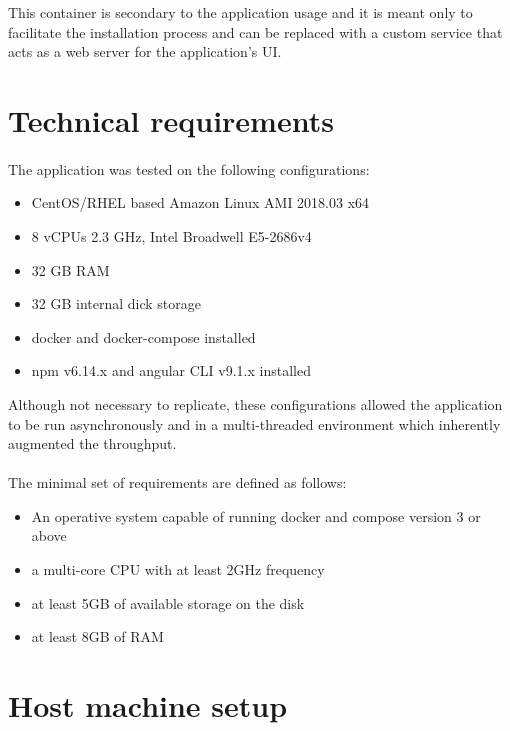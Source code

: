 \documentclass{scrreprt}
\begin{document}
This container is secondary to the application usage and it is meant only to facilitate the installation process and can be replaced with a custom service that acts as a web server for the application's UI.



\section{Technical requirements}
\paragraph{}The application was tested on the following configurations:
\begin{itemize}
	\item CentOS/RHEL based Amazon Linux AMI 2018.03 x64
	\item 8 vCPUs 2.3 GHz, Intel Broadwell E5-2686v4
	\item 32 GB RAM
	\item 32 GB internal dick storage
	\item docker and docker-compose installed
	\item npm v6.14.x and angular CLI v9.1.x installed 
\end{itemize}
Although not necessary to replicate, these configurations allowed the application to be run asynchronously and in a multi-threaded environment which inherently augmented the throughput.


\paragraph{}The minimal set of requirements are defined as follows:
\begin{itemize}
	\item An operative system capable of running docker and compose version 3 or above
	\item a multi-core CPU with at least 2GHz  frequency
	\item at least 5GB of available storage on the disk
	\item at least 8GB of RAM
\end{itemize}


\section{Host machine setup}
\end{document}
